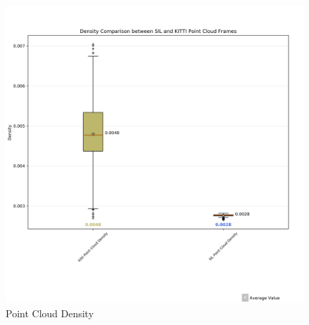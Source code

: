 \begin{figure}[H] %
	\centering
	\includegraphics[width=0.6\linewidth]{images/density}
	\caption{Point Cloud Density}
	\label{fig:density}
\end{figure}
